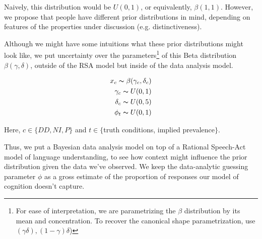 \documentclass[10pt,letterpaper]{article}
\begin{document}
Naively, this distribution would be $U(0,1)$, or equivalently, $\beta(1,1)$. However, we propose that people have different prior distributions in mind, depending on features of the properties under discussion (e.g. distinctiveness).

Although we might have some intuitions what these prior distributions might look like, we put uncertainty over the parameters\footnote{For ease of interpretation, we are parametrizing the $\beta$ distribution by its mean and concentration. To recover the canonical shape parametrization, use $(\gamma \delta), (1-\gamma)\delta$)} of this Beta distribution $\beta(\gamma,\delta)$, outside of the RSA model but inside of the data analysis model. 

\begin{align*}
x_{c} \thicksim \beta(\gamma_{c},\delta_{c}) \\
\gamma_{c} \thicksim U(0,1) \\
\delta_{c} \thicksim U(0,5) \\
\phi_{t} \thicksim U(0,1) 
\end{align*}

Here, $c \in \{DD,NI,P\}$ and $t \in \{$truth conditions, implied prevalence$\}$.

Thus, we put a Bayesian data analysis model on top of a Rational Speech-Act model of language understanding, to see how context might influence the prior distribution given the data we've observed. We keep the data-analytic guessing parameter $\phi$ as a gross estimate of the proportion of responses our model of cognition doesn't capture. 
%	
%			
%			
%	
%				
%				

\end{document}
